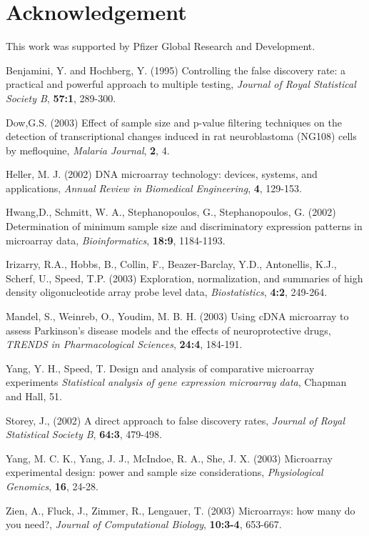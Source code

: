 \documentclass{bioinfo}
\begin{document}
\section*{Acknowledgement}

This work was supported by Pfizer Global Research and Development.

\begin{thebibliography}{}

 Benjamini, Y. 
  and Hochberg, Y. (1995) Controlling the false discovery rate: a
  practical and powerful approach to multiple testing, {\it Journal
  of Royal Statistical Society B}, {\bf 57:1}, 289-300.

 Dow,G.S. (2003) Effect of sample size
  and p-value filtering techniques on the detection of
  transcriptional changes induced in rat neuroblastoma (NG108) cells
  by mefloquine, {\it Malaria Journal}, {\bf 2}, 4.

 Heller, M. J. (2002) {DNA
  microarray technology: devices, systems, and applications}, {\it
  Annual Review in Biomedical Engineering}, {\bf 4}, 129-153.

 Hwang,D., Schmitt,
  W. A., Stephanopoulos, G., Stephanopoulos, G. (2002) Determination
  of minimum sample size and discriminatory expression patterns in
  microarray data, {\it Bioinformatics}, {\bf 18:9}, 1184-1193.

 Irizarry, R.A.,
  Hobbs, B., Collin, F., Beazer-Barclay, Y.D., Antonellis, K.J.,
  Scherf, U., Speed, T.P. (2003) Exploration, normalization, and
  summaries of high density oligonucleotide array probe level data,
  {\it Biostatistics}, {\bf 4:2}, 249-264.

 Mandel, S.,  Weinreb,
  O., Youdim, M. B. H. (2003) Using cDNA microarray to assess
  Parkinson's disease models and the effects of neuroprotective
  drugs, {\it TRENDS in Pharmacological Sciences}, {\bf 24:4},
  184-191.

 Yang, Y. H., Speed, T. 
  {Design and analysis of comparative microarray experiments \it
  Statistical analysis of gene expression microarray data}, {Chapman
  and Hall}, 51.

 Storey, J., (2002)
  A direct approach to false discovery rates, {\it Journal of Royal
  Statistical Society B}, {\bf 64:3}, 479-498.

 Yang, M. C. K., Yang,
  J. J., McIndoe, R. A., She, J. X. (2003) Microarray experimental
  design: power and sample size considerations, {\it Physiological
  Genomics}, {\bf 16}, 24-28.

 Zien, A., Fluck, J.,
  Zimmer, R., Lengauer, T. (2003) Microarrays: how many do you
  need?, {\it Journal of Computational Biology}, {\bf 10:3-4},
  653-667.

\end{thebibliography}
\end{document}
